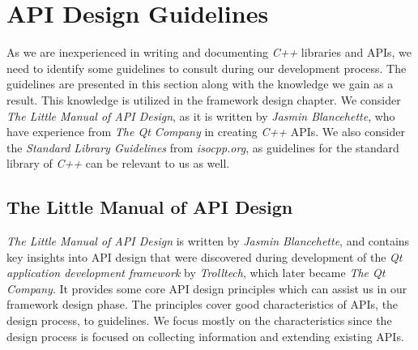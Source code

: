 \section{API Design Guidelines}
As we are inexperienced in writing and documenting \textit{C++} libraries and APIs, we need to identify some guidelines to consult during our development process. The guidelines are presented in this section along with the knowledge we gain as a result. This knowledge is utilized in the framework design chapter. 
We consider \textit{The Little Manual of API Design}\cite{apiDesignManual}, as it is written by \textit{Jasmin Blancehette}, who have experience from \textit{The Qt Company} in creating \textit{C++} APIs. We also consider the \textit{Standard Library Guidelines}\cite{isoLibDesign} from \textit{isocpp.org}, as guidelines for the standard library of \textit{C++} can be relevant to us as well.

\subsection{The Little Manual of API Design}
\textit{The Little Manual of API Design} is written by \textit{Jasmin Blancehette}, and contains key insights into API design that were discovered during development of the \textit{Qt application development framework} by \textit{Trolltech}, which later became \textit{The Qt Company}. It provides some core API design principles which can assist us in our framework design phase. The principles cover good characteristics of APIs, the design process, to guidelines. We focus mostly on the characteristics since the design process is focused on collecting information and extending existing APIs.

